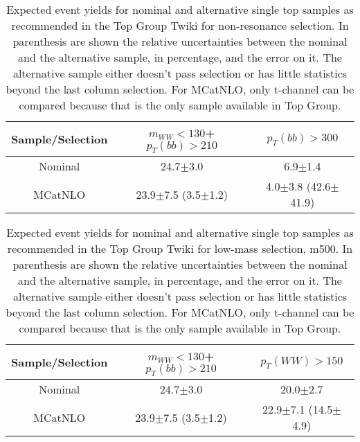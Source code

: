 \begin{table}
\caption{Expected event yields for nominal and alternative single top samples as recommended in the Top Group Twiki for non-resonance selection. In parenthesis are shown the relative uncertainties between the nominal and the alternative sample, in percentage, and the error on it. The alternative sample either doesn't pass selection or has little statistics beyond the last column selection. For MCatNLO, only t-channel can be compared because that is the only sample available in Top Group.} 
\begin{tabular}{c|c|c|}
Sample/Selection & $m_{WW}<130$+$p_{T}(bb)>210$  		& $p_{T}(bb)>300$ \\
\hline
Nominal  		& 24.7$\pm$3.0 						& 6.9$\pm$1.4\\
\hline
 MCatNLO      & 23.9$\pm$7.5 (3.5$\pm$1.2) 				& 4.0$\pm$3.8 (42.6$\pm$41.9)   			\\
 \hline
\hline
\end{tabular}
\end{table}


\begin{table}
\caption{Expected event yields for nominal and alternative single top samples as recommended in the Top Group Twiki for low-mass selection, m500. In parenthesis are shown the relative uncertainties between the nominal and the alternative sample, in percentage, and the error on it. The alternative sample either doesn't pass selection or has little statistics beyond the last column selection. For MCatNLO, only t-channel can be compared because that is the only sample available in Top Group.} 
\begin{tabular}{c|c|c|}
Sample/Selection & $m_{WW}<130$+$p_{T}(bb)>210$  		& $p_{T}(WW)>150$ \\
\hline
Nominal  		& 24.7$\pm$3.0 						& 20.0$\pm$2.7\\
\hline
 MCatNLO      & 23.9$\pm$7.5 (3.5$\pm$1.2) 				& 22.9$\pm$7.1 (14.5$\pm$4.9)   			\\
 \hline
\hline
\end{tabular}
\end{table}


